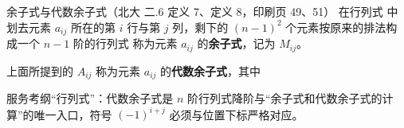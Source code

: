 \begin{fdeep}{余子式与代数余子式（北大 二.6 定义 7、定义 8，印刷页 49、51）}
\quad 在行列式
中划去元素 $a_{ij}$ 所在的第 $i$ 行与第 $j$ 列，剩下的 $(n-1)^2$ 个元素按原来的排法构成一个 $n-1$ 阶的行列式
称为元素 $a_{ij}$ 的\textbf{余子式}，记为 $M_{ij}$。

\quad 上面所提到的 $A_{ij}$ 称为元素 $a_{ij}$ 的\textbf{代数余子式}，其中

\fbref{}服务考纲“行列式”：代数余子式是 $n$ 阶行列式降阶与“余子式和代数余子式的计算”的唯一入口，符号 $(-1)^{i+j}$ 必须与位置下标严格对应。
\end{fdeep}

